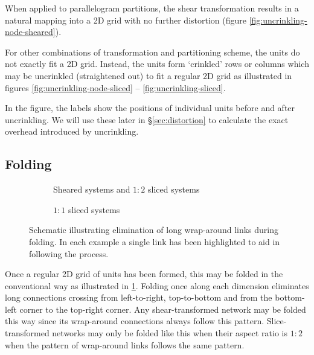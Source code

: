 			When applied to parallelogram partitions, the shear transformation
			results in a natural mapping into a 2D grid with no further distortion
			(figure \ref{fig:uncrinkling-node-sheared}).
			
			For other combinations of transformation and partitioning scheme, the
			units do not exactly fit a 2D grid. Instead, the units form `crinkled'
			rows or columns which may be uncrinkled (straightened out) to fit a
			regular 2D grid as illustrated in figures
			\ref{fig:uncrinkling-node-sliced} -- \ref{fig:uncrinkling-sliced}.
			
			In the figure, the labels show the positions of individual units before
			and after uncrinkling. We will use these later in \S\ref{sec:distortion}
			to calculate the exact overhead introduced by uncrinkling.
		
		\subsection{Folding}
			
			\begin{figure}
				\begin{subfigure}{\linewidth}
					\center
					\caption{Sheared systems and $1:2$ sliced systems}
					\label{fig:folding-sheared}
				\end{subfigure}
				
				\vspace{1em}
				
				\begin{subfigure}{\linewidth}
					\center
					\caption{$1:1$ sliced systems}
					\label{fig:folding-sliced}
				\end{subfigure}
				
				\caption{Schematic illustrating elimination of long wrap-around links
				during folding. In each example a single link has been highlighted to
				aid in following the process.}
				\label{fig:folding}
			\end{figure}
			
			Once a regular 2D grid of units has been formed, this may be folded in
			the conventional way as illustrated in \ref{fig:folding-sheared}. Folding
			once along each dimension eliminates long connections crossing from
			left-to-right, top-to-bottom and from the bottom-left corner to the
			top-right corner. Any shear-transformed network may be folded this way
			since its wrap-around connections always follow this pattern.
			Slice-transformed networks may only be folded like this when their aspect
			ratio is $1:2$ when the pattern of wrap-around links follows the same
			pattern.
			
